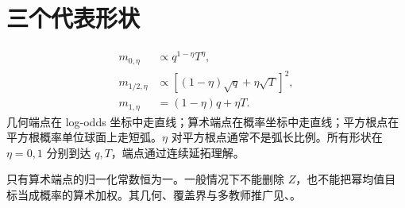 \section{三个代表形状}
\begin{equation}
\begin{aligned}
m_{0,\eta}&\propto q^{1-\eta}T^\eta,\\
m_{1/2,\eta}&\propto[(1-\eta)\sqrt q+\eta\sqrt T]^2,\\
m_{1,\eta}&=(1-\eta)q+\eta T.
\end{aligned}
\label{eq:three-targets}
\end{equation}
几何端点在 log-odds 坐标中走直线；算术端点在概率坐标中走直线；平方根点在平方根概率单位球面上走短弧。$\eta$ 对平方根点通常不是弧长比例。所有形状在 $\eta=0,1$ 分别到达 $q,T$，端点通过连续延拓理解。

只有算术端点的归一化常数恒为一。一般情况下不能删除 $Z$，也不能把幂均值目标当成概率的算术加权。其几何、覆盖界与多教师推广见、。
